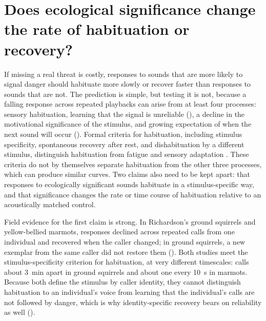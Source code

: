 \section{Does ecological significance change the rate of habituation or recovery?}
\label{sec:q6}


If missing a real threat is costly, responses to sounds that are more likely to signal danger should habituate more slowly or recover faster than responses to sounds that are not. The prediction is simple, but testing it is not, because a falling response across repeated playbacks can arise from at least four processes: sensory habituation, learning that the signal is unreliable (), a decline in the motivational significance of the stimulus, and growing expectation of when the next sound will occur ().
Formal criteria for habituation, including stimulus specificity, spontaneous recovery after rest, and dishabituation by a different stimulus, distinguish habituation from fatigue and sensory adaptation \citep{RankinEtAl2009}. These criteria do not by themselves separate habituation from the other three processes, which can produce similar curves. Two claims also need to be kept apart: that responses to ecologically significant sounds habituate in a stimulus-specific way, and that significance changes the rate or time course of habituation relative to an acoustically matched control.

Field evidence for the first claim is strong. In Richardson's ground squirrels and yellow-bellied marmots, responses declined across repeated calls from one individual and recovered when the caller changed; in ground squirrels, a new exemplar from the same caller did not restore them \citep{Hare1998,BlumsteinDaniel2004} (). Both studies meet the stimulus-specificity criterion for habituation, at very different timescales: calls about 3~min apart in ground squirrels and about one every 10~s in marmots. Because both define the stimulus by caller identity, they cannot distinguish habituation to an individual's voice from learning that the individual's calls are not followed by danger, which is why identity-specific recovery bears on reliability as well ().

